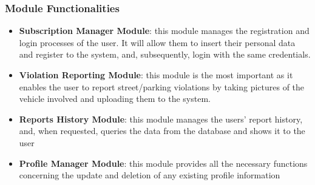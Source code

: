 \documentclass[12pt,a4paper]{article}
\begin{document}
\subsubsection*{Module Functionalities}
\begin{itemize}
\item \textbf{Subscription Manager Module}: this module manages the registration and login processes of the user. It will allow them to insert their personal data and register to the system, and, subsequently, login with the same credentials. 
\item \textbf{Violation Reporting Module}: this module is the most important as it enables the user to report street/parking violations by taking pictures of the vehicle involved and uploading them to the system. 
\item \textbf{Reports History Module}: this module manages the users' report history, and, when requested, queries the data from the database and shows it to the user
\item \textbf{Profile Manager Module}: this module provides all the necessary functions concerning the update and deletion of any existing profile information\\\\
\end{itemize}
\end{document}
